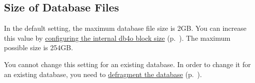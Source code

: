 \subsection*{Size of Database Files}

In the default setting, the maximum database file size is 2GB. You can increase this value by \hyperref[ref:configuration-file-block-size]{configuring the internal db4o block size} (p.~\pageref{ref:configuration-file-block-size}). The maximum possible size is 254GB.

You cannot change this setting for an existing database. In order to change it for an existing database, you need to \hyperref[ref:troubleshoot-increasing-the-maximum-database-file-size]{defragment the database} (p.~\pageref{ref:troubleshoot-increasing-the-maximum-database-file-size}).

